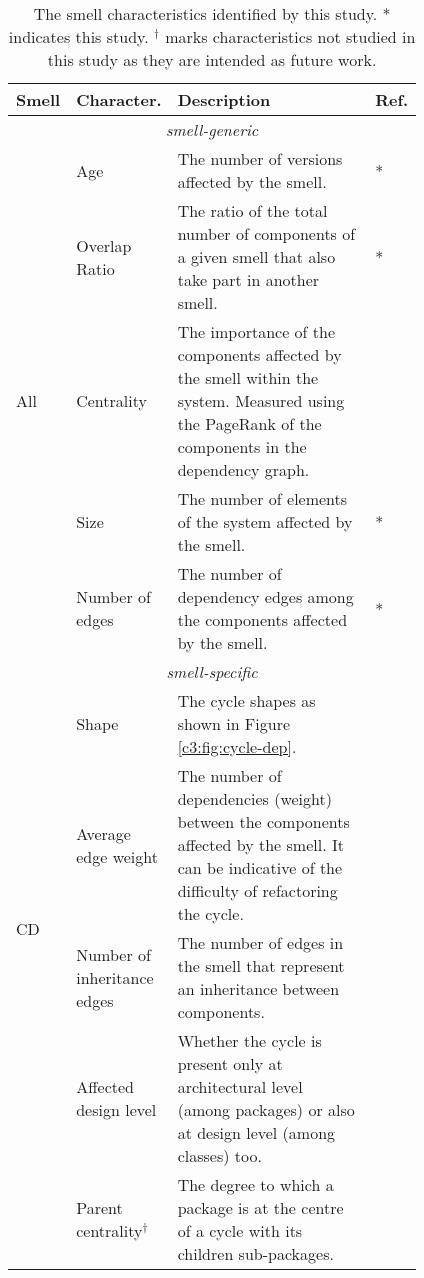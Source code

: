 \begin{table}[]
    \footnotesize
    \centering
    \caption{The smell characteristics identified by this study. * indicates this study. $^\dagger$ marks characteristics not studied in this study as they are intended as future work.}
    \label{tab:smell-characteristics}
    \begin{tabular}{p{0.035\linewidth}p{0.15\linewidth}p{0.60\linewidth}p{0.025\linewidth}}
    \toprule
    \textbf{Smell} & \textbf{Character.} & \textbf{Description} & \textbf{Ref.} \\ \midrule
    \multicolumn{4}{c}{\itshape smell-generic}\\\midrule
    \multirow{5}{*}{All} & Age & The number of versions affected by the smell. & * \\
     & Overlap Ratio & The ratio of the total number of components of a given smell that also take part in another smell. & * \\
     & Centrality & The importance of the components affected by the smell within the system. Measured using the PageRank of the components in the dependency graph. & \cite{Roveda2018} \\
     & Size & The number of elements of the system affected by the smell. & * \\
     & Number of edges & The number of dependency edges among the components affected by the smell. & * \\ \midrule
    \multicolumn{4}{c}{\itshape smell-specific}\\\midrule
    \multirow{4}{0.1\linewidth}{CD} & Shape & The cycle shapes as shown in Figure \ref{c3:fig:cycle-dep}. & \cite{Arcelli2016,AlMutawa2014}\\
    & Average edge weight &  The number of dependencies (weight) between the components affected by the smell. It can be indicative of the difficulty of refactoring the cycle. & \cite{Arcelli2017}\\
     & Number of inheritance edges & The number of edges in the smell that represent an inheritance between components. & \cite{Laval2012} \\
     & Affected design level & Whether the cycle is present only at architectural level (among packages) or also at design level (among classes) too. & \cite{AlMutawa2014} \\
     & Parent centrality$^\dagger$ & The degree to which a package is at the centre of a cycle with its children sub-packages. & \cite{AlMutawa2014}\\ \midrule

\end{tabular}
\end{table}
